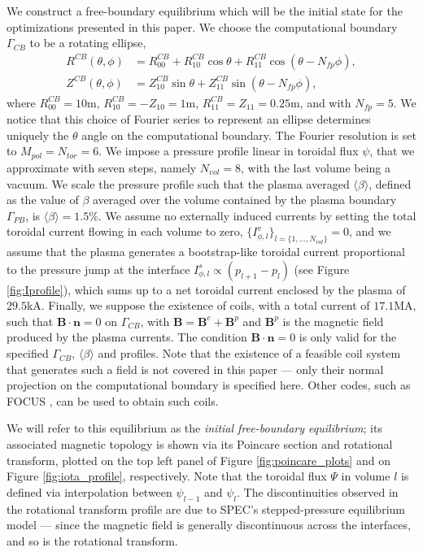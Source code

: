We construct a free-boundary equilibrium which will be the initial state for the optimizations presented in this paper. We choose the computational boundary $\Gamma_{CB}$ to be a rotating ellipse, 
\begin{align}
    R^{CB}(\theta,\phi) &= R^{CB}_{00} + R^{CB}_{10}\cos\theta + R^{CB}_{11}\cos(\theta-N_{fp}\phi), \label{eq.rotellipse1}\\
    Z^{CB}(\theta,\phi) &= Z^{CB}_{10}\sin\theta + Z^{CB}_{11}\sin(\theta-N_{fp}\phi),\label{eq.rotellipse2}
\end{align}
where $R^{CB}_{00}=10$m, $R^{CB}_{10}=-Z_{10}=1$m, $R^{CB}_{11}=Z_{11}=0.25$m, and with $N_{fp}=5$.  We notice that this choice of Fourier series to represent an ellipse determines uniquely the $\theta$ angle on the computational boundary. The Fourier resolution is set to $M_{pol}=N_{tor}=6$. We impose a pressure profile linear in toroidal flux $\psi$, that we approximate with seven steps, namely $N_{vol}=8$, with the last volume being a vacuum. We scale the pressure profile such that the plasma averaged $\langle\beta\rangle$, defined as the value of $\beta$ averaged over the volume contained by the plasma boundary $\Gamma_{PB}$, is $\langle\beta\rangle=1.5\%$. We assume no externally induced currents by setting the total toroidal current flowing in each volume to zero, $\{I^v_{\phi,l}\}_{l=\{1,\ldots,N_{vol}\}}=0$, and we assume that the plasma generates a bootstrap-like toroidal current proportional to the pressure jump at the interface  $I^s_{\phi,l}\propto (p_{l+1}-p_l)$ (see Figure \ref{fig:Iprofile}), which sums up to a net toroidal current enclosed by the plasma of $29.5$kA. Finally, we suppose the existence of coils, with a total current of $17.1$MA, such that $\mathbf{B}\cdot\mathbf{n}=0$ on $\Gamma_{CB}$, with $\mathbf{B}=\mathbf{B}^c+\mathbf{B}^p$ and $\mathbf{B}^p$ is the magnetic field produced by the plasma currents. The condition $\mathbf{B}\cdot\mathbf{n}=0$ is only valid for the specified $\Gamma_{CB}$, $\langle\beta\rangle$ and profiles. Note that the existence of a feasible coil system that generates such a field is not covered in this paper --- only their normal projection on the computational boundary is specified here. Other codes, such as \ac{FOCUS} \citep{Zhu2018a}, can be used to obtain such coils.  

We will refer to this equilibrium as the \emph{initial free-boundary equilibrium}; its associated magnetic topology is shown via its Poincare section and rotational transform, plotted on the top left panel of Figure \ref{fig:poincare_plots} and on Figure \ref{fig:iota_profile}, respectively. Note that the toroidal flux $\Psi$ in volume $l$ is defined via interpolation between $\psi_{l-1}$ and $\psi_l$. The discontinuities observed in the rotational transform profile are due to \ac{SPEC}'s stepped-pressure equilibrium model --- since the magnetic field is generally discontinuous across the interfaces, and so is the rotational transform.

